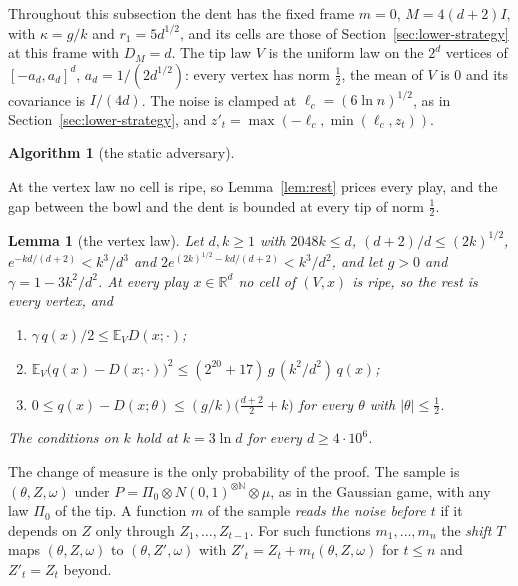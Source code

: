 \documentclass[11pt]{amsart}
\newtheorem{lemma}[theorem]{Lemma}
\theoremstyle{definition}
\newtheorem{algorithm}[theorem]{Algorithm}
\numberwithin{equation}{section}
\newcommand{\R}{\mathbb{R}}
\newcommand{\E}{\mathbb{E}}
\begin{document}
Throughout this subsection the dent has the fixed frame $m=0$, $M=4(d+2)I$, with $\kappa=g/k$ and $r_1=5d^{1/2}$, and its cells are those of Section~\ref{sec:lower-strategy} at this frame with $D_M=d$. The tip law $V$ is the uniform law on the $2^d$ vertices of $[-a_d,a_d]^d$, $a_d=1/(2d^{1/2})$: every vertex has norm $\frac12$, the mean of $V$ is $0$ and its covariance is $I/(4d)$. The noise is clamped at $\ell_c=(6\ln n)^{1/2}$, as in Section~\ref{sec:lower-strategy}, and $z'_t=\max(-\ell_c,\min(\ell_c,z_t))$.

\begin{algorithm}[the static adversary]\label{alg:static}
\leavevmode
\begin{center}
\end{center}
\end{algorithm}

At the vertex law no cell is ripe, so Lemma~\ref{lem:rest} prices every play, and the gap between the bowl and the dent is bounded at every tip of norm $\frac12$.

\begin{lemma}[the vertex law]\label{lem:vertex}
Let $d,k\ge1$ with $2048k\le d$, $(d+2)/d\le(2k)^{1/2}$, $e^{-kd/(d+2)}<k^3/d^3$ and $2e^{(2k)^{1/2}-kd/(d+2)}<k^3/d^2$, and let $g>0$ and $\gamma=1-3k^2/d^2$. At every play $x\in\R^d$ no cell of $(V,x)$ is ripe, so the rest is every vertex, and
\begin{enumerate}[label=(\roman*)]
\item $\gamma\,q(x)/2\le\E_VD(x;\cdot)$;
\item $\E_V\bigl(q(x)-D(x;\cdot)\bigr)^2\le(2^{20}+17)\,g\,(k^2/d^2)\,q(x)$;
\item $0\le q(x)-D(x;\theta)\le(g/k)\bigl(\frac{d+2}2+k\bigr)$ for every $\theta$ with $|\theta|\le\frac12$.
\end{enumerate}
The conditions on $k$ hold at $k=3\ln d$ for every $d\ge4\cdot10^6$.
\end{lemma}

The change of measure is the only probability of the proof. The sample is $(\theta,Z,\omega)$ under $P=\Pi_0\otimes N(0,1)^{\otimes\mathbb N}\otimes\mu$, as in the Gaussian game, with any law $\Pi_0$ of the tip. A function $m$ of the sample \emph{reads the noise before $t$} if it depends on $Z$ only through $Z_1,\dots,Z_{t-1}$. For such functions $m_1,\dots,m_n$ the \emph{shift} $T$ maps $(\theta,Z,\omega)$ to $(\theta,Z',\omega)$ with $Z'_t=Z_t+m_t(\theta,Z,\omega)$ for $t\le n$ and $Z'_t=Z_t$ beyond.
\end{document}
